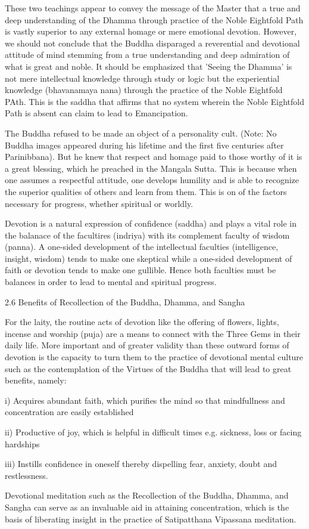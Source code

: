 These two teachings appear to convey the message of the Master that a true and deep understanding of the Dhamma through practice of the Noble Eightfold Path is vastly superior to any external homage or mere emotional devotion. However, we should not conclude that the Buddha disparaged a reverential and devotional attitude of mind stemming from a true understanding and deep admiration of what is great and noble. It should be emphasized that 'Seeing the Dhamma' is not mere intellectual knowledge through study or logic but the experiential knowledge (bhavanamaya nana) through the practice of the Noble Eightfold PAth. This is the saddha that affirms that no system wherein the Noble Eightfold Path is absent can claim to lead to Emancipation.

The Buddha refused to be made an object of a personality cult. (Note: No Buddha images appeared during his lifetime and the first five centuries after Parinibbana). But he knew that respect and homage paid to those worthy of it is a great blessing, which he preached in the Mangala Sutta. This is because when one assumes a respectful attitude, one develops humility and is able to recognize the superior qualities of others and learn from them. This is on of the factors necessary for progress, whether spiritual or worldly.

Devotion is a natural expression of confidence (saddha) and plays a vital role in the balanace of the facultires (indriya) with its complement faculty of wisdom (panna). A one-sided development of the intellectual faculties (intelligence, insight, wisdom) tends to make one skeptical while a one-sided development of faith or devotion tends to make one gullible. Hence both faculties must be balances in order to lead to mental and spiritual progress.

2.6 Benefits of Recollection of the Buddha, Dhamma, and Sangha

For the laity, the routine acts of devotion like the offering of flowers, lights, incense and worship (puja) are a means to connect with the Three Gems in their daily life. More important and of greater validity than these outward forms of devotion is the capacity to turn them to the practice of devotional mental culture such as the contemplation of the Virtues of the Buddha that will lead to great benefits, namely:

i) Acquires abundant faith, which purifies the mind so that mindfullness and concentration are easily established

ii) Productive of joy, which is helpful in difficult times e.g. sickness, loss or facing hardships

iii) Instills confidence in oneself thereby dispelling fear, anxiety, doubt and restlessness.

Devotional meditation such as the Recollection of the Buddha, Dhamma, and Sangha can serve as an invaluable aid in attaining concentration, which is the basis of liberating insight in the practice of Satipatthana Vipassana meditation.